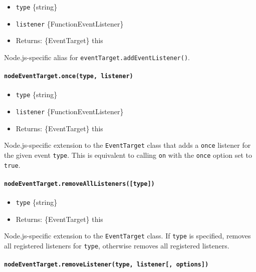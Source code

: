 \begin{itemize}
\item
  \texttt{type} \{string\}
\item
  \texttt{listener} \{Function\textbar EventListener\}
\item
  Returns: \{EventTarget\} this
\end{itemize}

Node.js-specific alias for \texttt{eventTarget.addEventListener()}.

\paragraph{\texorpdfstring{\texttt{nodeEventTarget.once(type,\ listener)}}{nodeEventTarget.once(type, listener)}}\label{nodeeventtarget.oncetype-listener}

\begin{itemize}
\item
  \texttt{type} \{string\}
\item
  \texttt{listener} \{Function\textbar EventListener\}
\item
  Returns: \{EventTarget\} this
\end{itemize}

Node.js-specific extension to the \texttt{EventTarget} class that adds a
\texttt{once} listener for the given event \texttt{type}. This is
equivalent to calling \texttt{on} with the \texttt{once} option set to
\texttt{true}.

\paragraph{\texorpdfstring{\texttt{nodeEventTarget.removeAllListeners({[}type{]})}}{nodeEventTarget.removeAllListeners({[}type{]})}}\label{nodeeventtarget.removealllistenerstype}

\begin{itemize}
\item
  \texttt{type} \{string\}
\item
  Returns: \{EventTarget\} this
\end{itemize}

Node.js-specific extension to the \texttt{EventTarget} class. If
\texttt{type} is specified, removes all registered listeners for
\texttt{type}, otherwise removes all registered listeners.

\paragraph{\texorpdfstring{\texttt{nodeEventTarget.removeListener(type,\ listener{[},\ options{]})}}{nodeEventTarget.removeListener(type, listener{[}, options{]})}}\label{nodeeventtarget.removelistenertype-listener-options}

